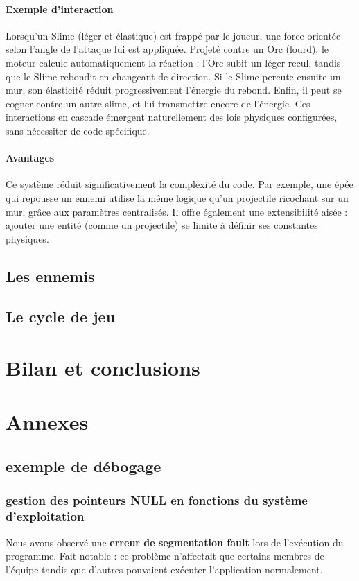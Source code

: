 \documentclass[a4paper,11pt]{article}
\begin{document}
\paragraph{Exemple d'interaction}  
Lorsqu’un Slime (léger et élastique) est frappé par le joueur, une force orientée selon l’angle de l’attaque lui est appliquée. Projeté contre un Orc (lourd), le moteur calcule automatiquement la réaction : l’Orc subit un léger recul, tandis que le Slime rebondit en changeant de direction. Si le Slime percute ensuite un mur, son élasticité réduit progressivement l’énergie du rebond. Enfin, il peut se cogner contre un autre slime, et lui transmettre encore de l’énergie. Ces interactions en cascade émergent naturellement des lois physiques configurées, sans nécessiter de code spécifique.

\paragraph{Avantages}  
Ce système réduit significativement la complexité du code. Par exemple, une épée qui repousse un ennemi utilise la même logique qu’un projectile ricochant sur un mur, grâce aux paramètres centralisés. Il offre également une extensibilité aisée : ajouter une entité (comme un projectile) se limite à définir ses constantes physiques.

\subsection{Les ennemis}

\subsection{Le cycle de jeu}

\section{Bilan et conclusions}

\section{Annexes}

\subsection{exemple de débogage}
\subsubsection{gestion des pointeurs NULL en fonctions du système d'exploitation}
Nous avons observé une \textbf{erreur de segmentation fault} lors de l'exécution du programme. Fait notable : ce problème n'affectait que certains membres de l'équipe tandis que d'autres pouvaient exécuter l'application normalement.
\end{document}
